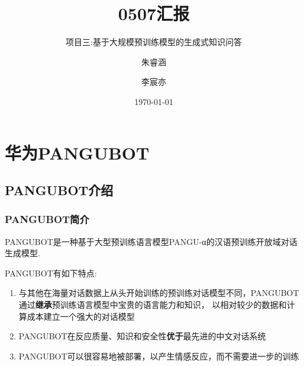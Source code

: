 \documentclass{beamer}
\title{0507汇报}
\subtitle{项目三:基于大规模预训练模型的生成式知识问答}
\author{朱睿涵 \and 李宸亦}
\date{\today}
\begin{document}
\frame{\titlepage} %


\section{华为PANGUBOT}

\subsection{PANGUBOT介绍}
\begin{frame}
    \frametitle{PANGUBOT简介}

    PANGUBOT是一种基于大型预训练语言模型PANGU-α的汉语预训练开放域对话生成模型.

    PANGUBOT有如下特点:

    \begin{enumerate}
        \item 与其他在海量对话数据上从头开始训练的预训练对话模型不同，PANGUBOT通过\textbf{继承}预训练语言模型中宝贵的语言能力和知识，
        以相对较少的数据和计算成本建立一个强大的对话模型
        \item PANGUBOT在反应质量、知识和安全性\textbf{优于}最先进的中文对话系统
        \item PANGUBOT可以很容易地被部署，以产生情感反应，而不需要进一步的训练
    \end{enumerate}
\end{frame}
\end{document}
